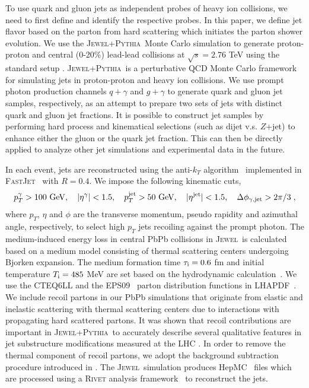 \documentclass[notoc]{JHEP3}
\newcommand{\text}[1]{{\rm #1}}
\newcommand{\jw}{\textsc{Jewel}~}
\newcommand{\jwpy}{\textsc{Jewel+Pythia}~}
\begin{document}
To use quark and gluon jets as independent probes of heavy ion collisions, we need to first define and identify the respective probes. In this paper, we define jet flavor based on the parton from hard scattering which initiates the parton shower evolution. We use the \jwpy Monte Carlo simulation to generate proton-proton and central (0-20\%) lead-lead collisions at $\sqrt{s}=2.76$ TeV using the standard setup \cite{Zapp:2013zya}. \jwpy is a perturbative QCD Monte Carlo framework for simulating jets in proton-proton and heavy ion collisions. We use prompt photon production channels \cite{KunnawalkamElayavalli:2016ttl} $q +\gamma$ and $g +\gamma$ to generate quark and gluon jet samples, respectively, as an attempt to prepare two sets of jets with distinct quark and gluon jet fractions. It is possible to construct jet samples by performing hard process and kinematical selections (such as dijet v.s. $Z$+jet) to enhance either the gluon or the quark jet fraction. This can then be directly applied to analyze other jet simulations and experimental data in the future.

In each event, jets are reconstructed using the anti-$k_T$ algorithm~\cite{Cacciari:2008gp} implemented in \textsc{FastJet}~\cite{Cacciari:2011ma} with $R = 0.4$. We impose the following kinematic cuts,
\begin{equation}
    p^{\gamma}_T > 100~{\rm GeV}, ~~~ |\eta^{\rm \gamma}|<1.5, ~~~ p^{\rm jet}_T > 50~{\rm GeV}, ~~~ |\eta^{\rm jet}|<1.5, ~~~\Delta \phi_{\gamma, {\rm jet}} > 2\pi/3\;,
\end{equation}
where $p_T$, $\eta$ and $\phi$ are the transverse momentum, pseudo rapidity and azimuthal angle, respectively, to select high $p_T$ jets recoiling against the prompt photon. The medium-induced energy loss in central PbPb collisions in \jw is calculated based on a medium model consisting of thermal scattering centers undergoing Bjorken expansion. The medium formation time $\tau_\text{i}=0.6 $ fm and initial temperature $T_\text{i}=485$ MeV are set based on the hydrodynamic calculation~\cite{Shen:2012vn,Shen:2014vra}. We use the \textsc{CTEQ6LL} \cite{Pumplin:2002vw} and the \textsc{EPS09}~\cite{Eskola:2009uj} parton distribution functions in \textsc{LHAPDF}~\cite{Whalley:2005nh}. We include recoil partons in our PbPb simulations that originate from elastic and inelastic scattering with thermal scattering centers due to interactions with propagating hard scattered partons. It was shown that recoil contributions are important in \jwpy to accurately describe several qualitative features in jet substructure modifications measured at the LHC \cite{KunnawalkamElayavalli:2017hxo,Milhano:2017nzm}. In order to remove the thermal component of recoil partons, we adopt the background subtraction procedure introduced in \cite{KunnawalkamElayavalli:2017hxo,Milhano:2017nzm}. The \jw simulation produces HepMC~\cite{} files which are processed using a \textsc{Rivet} analysis framework~\cite{} to reconstruct the jets.
\end{document}
